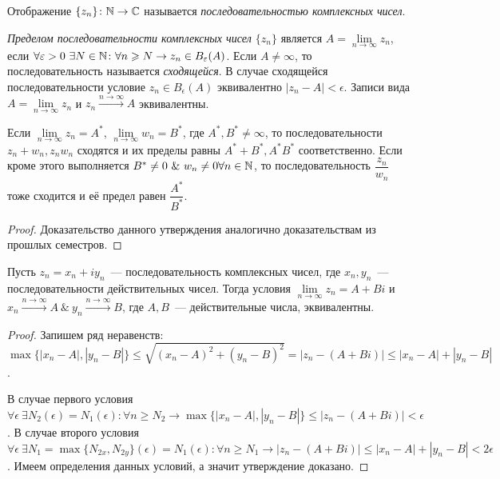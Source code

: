 
\begin{definition}
Отображение \(\{z_n\} \colon \mathbb{N} \to \mathbb{C}\) называется \textit{последовательностью комплексных чисел}.
\end{definition}

\begin{definition}
\textit{Пределом последовательности комплексных чисел \(\{z_n\}\)} является \(A = \lim\limits_{n \to
\infty} z_n\), если \(\forall \varepsilon > 0 \ \exists N \in \mathbb{N} \colon \forall n \geqslant N \rightarrow z_n
\in B_\varepsilon(A)\). Если \(A \ne \infty\), то последовательность называется \textit{сходящейся}. В
случае сходящейся последовательности условие \(z_n \in B_\epsilon(A)\) эквивалентно \(|z_n-A| <
\epsilon\). Записи вида \(A = \lim\limits_{n \to \infty} z_n\) и \(z_n \xrightarrow{n \to \infty}
A\) эквивалентны.
\end{definition}

\begin{statement}\label{7:arithmetic_properties}
Если \(\lim\limits_{n \to \infty} z_n = A^*\), \(\lim\limits_{n \to \infty} w_n = B^*\), где \(A^*,
B^* \ne \infty\), то последовательности \(z_n + w_n, z_nw_n\) сходятся и их пределы равны \(A^* +
B^*, A^*B^*\) соответственно. Если кроме этого выполняется \(B^* \ne 0 \ \& \ w_n \ne 0 \forall n
\in \mathbb{N}\), то последовательность \(\dfrac{z_n}{w_n}\) тоже сходится и её предел равен
\(\dfrac{A^*}{B^*}\).
\end{statement}

\begin{proof}
Доказательство данного утверждения аналогично доказательствам из прошлых семестров.
\end{proof}

\begin{statement}\label{7:complex_to_real}
Пусть \(z_n = x_n + iy_n\)~--- последовательность комплексных чисел, где \(x_n, y_n\)~---
последовательности действительных чисел. Тогда условия \(\lim\limits_{n \to \infty} z_n = A + Bi\) и
\(x_n \xrightarrow{n \to \infty} A \ \& \ y_n \xrightarrow{n \to \infty} B\), где \(A, B\)~---
действительные числа, эквивалентны.
\end{statement}

\begin{proof}
Запишем ряд неравенств: \(\max \{|x_n -A|, |y_n - B|\} \le \sqrt{(x_n-A)^2 + (y_n - B)^2} = |z_n -
(A+Bi)| \le |x_n - A| + |y_n - B|\).

В случае первого условия \(\forall \epsilon \ \exists N_2 (\epsilon) = N_1(\epsilon) \colon \forall
n \ge N_2 \rightarrow \max \{|x_n -A|, |y_n - B|\} \le |z_n - (A+Bi)| < \epsilon\). В случае второго
условия \(\forall \epsilon \ \exists N_1 = \max \{N_{2x}, N_{2y}\} (\epsilon) = N_1(\epsilon) \colon
\forall n \ge N_1 \rightarrow|z_n - (A+Bi)| \le |x_n - A| + |y_n - B| < 2\epsilon\). Имеем определения
данных условий, а значит утверждение доказано.
\end{proof}

